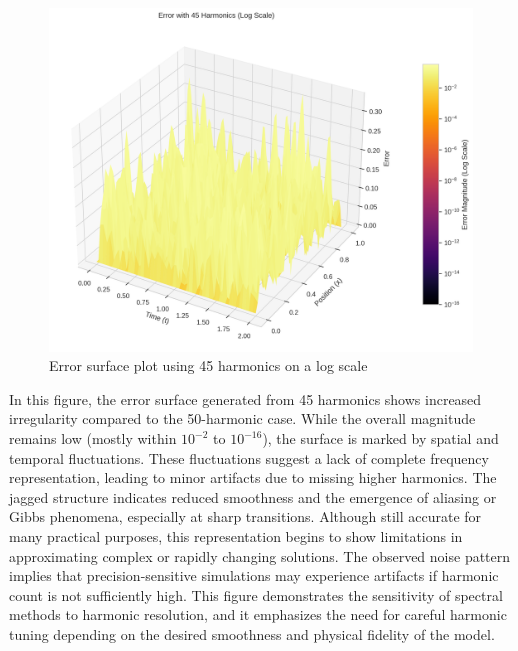 \documentclass[preprint,12pt]{elsarticle}
\begin{document}
\begin{figure}[t]
    \centering
    \includegraphics[width=0.9\linewidth]{figures/3d_comparison_error_45h.png}
    \caption{Error surface plot using 45 harmonics on a log scale}
    \label{fig:error_45h}
\end{figure}

In this figure, the error surface generated from 45 harmonics shows increased irregularity compared to the 50-harmonic case. While the overall magnitude remains low (mostly within \(10^{-2}\) to \(10^{-16}\)), the surface is marked by spatial and temporal fluctuations. These fluctuations suggest a lack of complete frequency representation, leading to minor artifacts due to missing higher harmonics. The jagged structure indicates reduced smoothness and the emergence of aliasing or Gibbs phenomena, especially at sharp transitions. Although still accurate for many practical purposes, this representation begins to show limitations in approximating complex or rapidly changing solutions. The observed noise pattern implies that precision-sensitive simulations may experience artifacts if harmonic count is not sufficiently high. This figure demonstrates the sensitivity of spectral methods to harmonic resolution, and it emphasizes the need for careful harmonic tuning depending on the desired smoothness and physical fidelity of the model.
\end{document}
